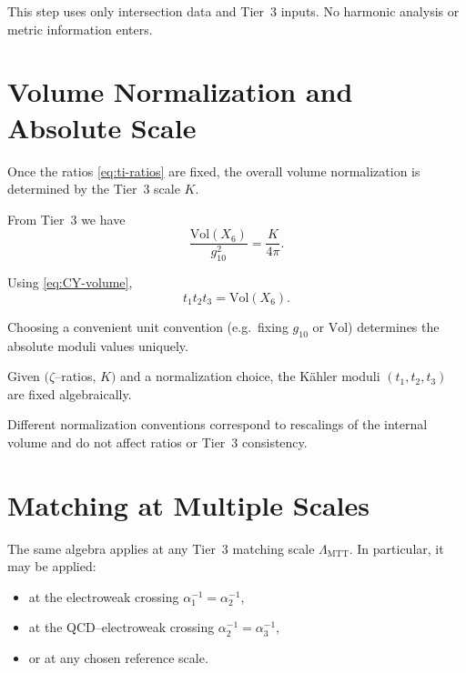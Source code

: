 \documentclass[11pt]{article}
\begin{document}
\begin{remark}
This step uses only intersection data and Tier~3 inputs.
No harmonic analysis or metric information enters.
\end{remark}

\section{Volume Normalization and Absolute Scale}

Once the ratios \eqref{eq:ti-ratios} are fixed, the overall volume
normalization is determined by the Tier~3 scale $K$.

From Tier~3 we have
\begin{equation}
\frac{\mathrm{Vol}(X_6)}{g_{10}^2}
=
\frac{K}{4\pi}.
\label{eq:vol-g10}
\end{equation}

Using \eqref{eq:CY-volume},
\begin{equation}
t_1 t_2 t_3
=
\mathrm{Vol}(X_6).
\end{equation}

Choosing a convenient unit convention (e.g.\ fixing $g_{10}$ or
$\mathrm{Vol}$) determines the absolute moduli values uniquely.

\begin{corollary}
Given $(\zeta$--ratios, $K)$ and a normalization choice,
the K\"ahler moduli $(t_1,t_2,t_3)$ are fixed algebraically.
\end{corollary}

\begin{remark}
Different normalization conventions correspond to rescalings of the
internal volume and do not affect ratios or Tier~3 consistency.
\end{remark}

\section{Matching at Multiple Scales}

The same algebra applies at any Tier~3 matching scale
$\Lambda_{\mathrm{MTT}}$.
In particular, it may be applied:
\begin{itemize}
  \item at the electroweak crossing $\alpha_1^{-1}=\alpha_2^{-1}$,
  \item at the QCD--electroweak crossing $\alpha_2^{-1}=\alpha_3^{-1}$,
  \item or at any chosen reference scale.
\end{itemize}
\end{document}
